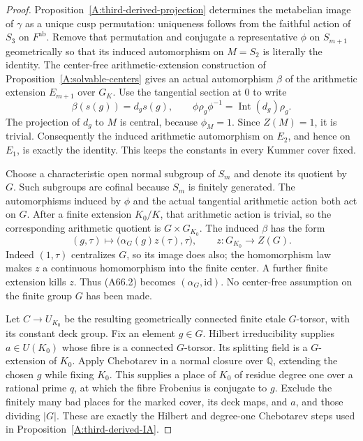 \documentclass[11pt,oneside]{article}
\begin{document}
\begin{proof}
Proposition~\ref{A:third-derived-projection} determines
the metabelian image of $\gamma$ as a unique cusp
permutation: uniqueness follows from the faithful
action of $S_3$ on $F^{\mathrm{ab}}$.
Remove that permutation and conjugate a representative
$\phi$ on $S_{m+1}$ geometrically so that its induced
automorphism on $M=S_2$ is literally the identity.
The center-free arithmetic-extension construction of
Proposition~\ref{A:solvable-centers} gives an actual
automorphism $\beta$ of the arithmetic extension
$E_{m+1}$ over $G_K$. Use the tangential section at
$0$ to write
\[
 \beta(s(g))=d_gs(g),\qquad
 \phi\rho_g\phi^{-1}=\operatorname{Int}(d_g)\rho_g.
\]
The projection of $d_g$ to $M$ is central, because
$\phi_M=1$. Since $Z(M)=1$, it is trivial.
Consequently the induced arithmetic automorphism
on $E_2$, and hence on $E_1$, is exactly the
identity. This keeps the constants in every Kummer
cover fixed.

Choose a characteristic open normal subgroup of
$S_m$ and denote its quotient by $G$.
Such subgroups are cofinal because $S_m$ is finitely
generated. The automorphisms induced by $\phi$ and
the actual tangential arithmetic action both act
on $G$. After a finite extension $K_0/K$, that
arithmetic action is trivial, so the corresponding
arithmetic quotient is
$G\times G_{K_0}$. The induced $\beta$ has the form
\[
 (g,\tau)\longmapsto
             \bigl(\alpha_G(g)z(\tau),\tau\bigr),
       \qquad z:G_{K_0}\longrightarrow Z(G).
                                                        \tag{A66.2}
\]
Indeed $(1,\tau)$ centralizes $G$, so its image
does also; the homomorphism law makes $z$ a
continuous homomorphism into the finite center.
A further finite extension kills $z$.
Thus (A66.2) becomes $(\alpha_G,\mathrm{id})$.
No center-free assumption on the finite group
$G$ has been made.

Let $C\to U_{K_0}$ be the resulting geometrically
connected finite etale $G$-torsor, with its constant
deck group. Fix an element $g\in G$.
Hilbert irreducibility supplies $a\in U(K_0)$
whose fibre is a connected $G$-torsor.
Its splitting field is a $G$-extension of $K_0$.
Apply Chebotarev in a normal closure over
$\mathbb Q$, extending the chosen $g$ while
fixing $K_0$. This supplies a place of $K_0$
of residue degree one over a rational prime $q$,
at which the fibre Frobenius is conjugate to $g$.
Exclude the finitely many bad places for the
marked cover, its deck maps, and $a$, and those
dividing $|G|$. These are exactly the Hilbert and
degree-one Chebotarev steps used in
Proposition~\ref{A:third-derived-IA}.


\end{proof}
\end{document}
